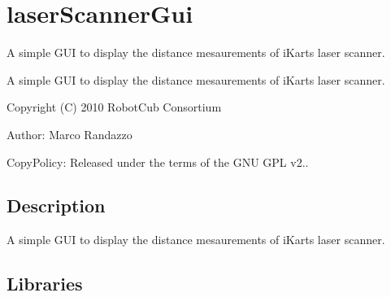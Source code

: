 \section{laser\+Scanner\+Gui}
\label{group__laserScannerGui}


A simple G\+U\+I to display the distance mesaurements of i\+Kart\textquotesingle{}s laser scanner.  


A simple G\+U\+I to display the distance mesaurements of i\+Kart\textquotesingle{}s laser scanner. 

Copyright (C) 2010 Robot\+Cub Consortium

Author\+: Marco Randazzo

Copy\+Policy\+: Released under the terms of the G\+N\+U G\+P\+L v2..\hypertarget{group__laserScannerGui_intro_sec}{}\subsection{Description}\label{group__laserScannerGui_intro_sec}
A simple G\+U\+I to display the distance mesaurements of i\+Kart\textquotesingle{}s laser scanner.\hypertarget{group__laserScannerGui_lib_sec}{}\subsection{Libraries}\label{group__laserScannerGui_lib_sec}

